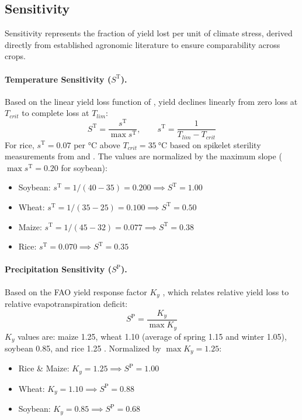 \documentclass[11pt,a4paper]{article}
\let\parencite\citep
\let\textcite\citet
\newcommand{\TT}{\mathrm{T}}   %
\newcommand{\PP}{\mathrm{P}}   %
\begin{document}
\subsection{Sensitivity}
Sensitivity represents the fraction of yield lost per unit of climate stress, derived directly from established agronomic literature to ensure comparability across crops.

\paragraph{Temperature Sensitivity ($S^{\TT}$).} Based on the linear yield loss function of \textcite{deryng2014}, yield declines linearly from zero loss at $T_{crit}$ to complete loss at $T_{lim}$:
\begin{equation}
S^{\TT} = \frac{s^{\TT}}{\max s^{\TT}},\qquad s^{\TT} = \frac{1}{T_{lim} - T_{crit}}
\end{equation}
For rice, $s^{\TT} = 0.07$ per \si{\celsius} above $T_{crit}=\SI{35}{\celsius}$ based on spikelet sterility measurements from \textcite{jagadish2007} and \textcite{yoshida1981}. The values are normalized by the maximum slope ($\max s^{\TT} = 0.20$ for soybean):
\begin{itemize}\setlength{\itemsep}{1pt}
\item Soybean: $s^{\TT} = 1/(40-35) = 0.200 \implies S^{\TT} = 1.00$
\item Wheat: $s^{\TT} = 1/(35-25) = 0.100 \implies S^{\TT} = 0.50$
\item Maize: $s^{\TT} = 1/(45-32) = 0.077 \implies S^{\TT} = 0.38$
\item Rice: $s^{\TT} = 0.070 \implies S^{\TT} = 0.35$
\end{itemize}

\paragraph{Precipitation Sensitivity ($S^{\PP}$).} Based on the FAO yield response factor $K_y$ \parencite{fao66}, which relates relative yield loss to relative evapotranspiration deficit:
\begin{equation}
S^{\PP} = \frac{K_y}{\max K_y}
\end{equation}
$K_y$ values are: maize 1.25, wheat 1.10 (average of spring 1.15 and winter 1.05), soybean 0.85, and rice 1.25 \parencite{fao66,brouwer1986}. Normalized by $\max K_y = 1.25$:
\begin{itemize}\setlength{\itemsep}{1pt}
\item Rice \& Maize: $K_y = 1.25 \implies S^{\PP} = 1.00$
\item Wheat: $K_y = 1.10 \implies S^{\PP} = 0.88$
\item Soybean: $K_y = 0.85 \implies S^{\PP} = 0.68$
\end{itemize}
\end{document}

